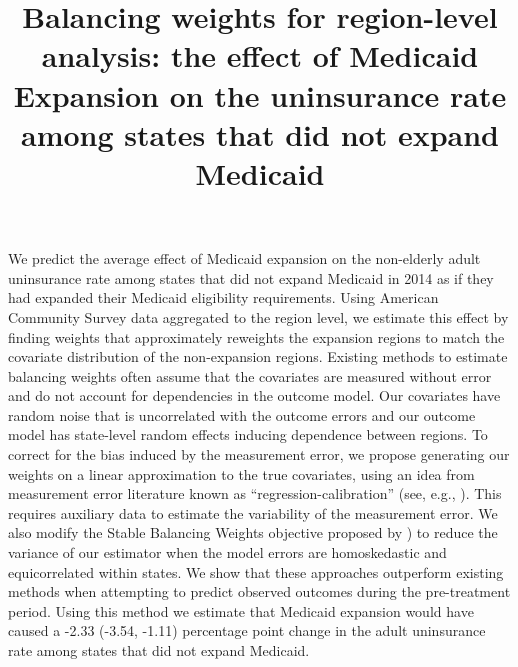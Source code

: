 \documentclass[aoas]{imsart}
\theoremstyle{plain}
\theoremstyle{remark}
\begin{document}
\begin{frontmatter}
\title{Balancing weights for region-level analysis: the effect of Medicaid Expansion on the uninsurance rate among states that did not expand Medicaid}


\begin{flushleft}
We predict the average effect of Medicaid expansion on the non-elderly adult uninsurance rate among states that did not expand Medicaid in 2014 as if they had expanded their Medicaid eligibility requirements. Using American Community Survey data aggregated to the region level, we estimate this effect by finding weights that approximately reweights the expansion regions to match the covariate distribution of the non-expansion regions. Existing methods to estimate balancing weights often assume that the covariates are measured without error and do not account for dependencies in the outcome model. Our covariates have random noise that is uncorrelated with the outcome errors and our outcome model has state-level random effects inducing dependence between regions. To correct for the bias induced by the measurement error, we propose generating our weights on a linear approximation to the true covariates, using an idea from measurement error literature known as ``regression-calibration'' (see, e.g., \cite{carroll2006measurement}). This requires auxiliary data to estimate the variability of the measurement error. We also modify the Stable Balancing Weights objective proposed by \cite{zubizarreta2015stable}) to reduce the variance of our estimator when the model errors are homoskedastic and equicorrelated within states. We show that these approaches outperform existing methods when attempting to predict observed outcomes during the pre-treatment period. Using this method we estimate that Medicaid expansion would have caused a -2.33 (-3.54, -1.11) percentage point change in the adult uninsurance rate among states that did not expand Medicaid.
\end{flushleft}


\begin{keyword}
\end{keyword}

\end{frontmatter}
\end{document}
